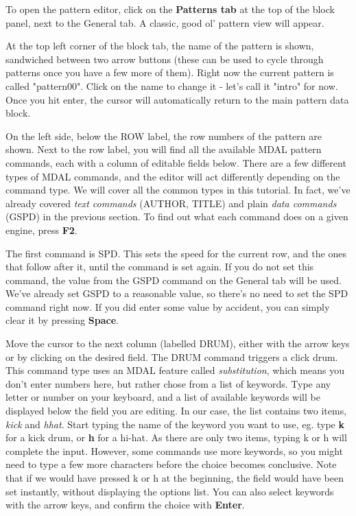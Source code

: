 \documentclass[12pt]{report}	%
\begin{document}
To open the pattern editor, click on the \textbf{Patterns tab} at the top of the block panel, next to the General tab. A classic, good ol' pattern view will appear.

At the top left corner of the block tab, the name of the pattern is shown, sandwiched between two arrow buttons (these can be used to cycle through patterns once you have a few more of them). Right now the current pattern is called "pattern00". Click on the name to change it - let's call it "intro" for now. Once you hit enter, the cursor will automatically return to the main pattern data block.

On the left side, below the ROW label, the row numbers of the pattern are shown. Next to the row label, you will find all the available MDAL pattern commands, each with a column of editable fields below. There are a few different types of MDAL commands, and the editor will act differently depending on the command type. We will cover all the common types in this tutorial. In fact, we've already covered \textit{text commands} (AUTHOR, TITLE) and plain \textit{data commands} (GSPD) in the previous section. To find out what each command does on a given engine, press \textbf{F2}.

The first command is SPD. This sets the speed for the current row, and the ones that follow after it, until the command is set again. If you do not set this command, the value from the GSPD command on the General tab will be used. We've already set GSPD to a reasonable value, so there's no need to set the SPD command right now. If you did enter some value by accident, you can simply clear it by pressing \textbf{Space}.

Move the cursor to the next column (labelled DRUM), either with the arrow keys or by clicking on the desired field. The DRUM command triggers a click drum. This command type uses an MDAL feature called \textit{substitution}, which means you don't enter numbers here, but rather chose from a list of keywords. Type any letter or number on your keyboard, and a list of available keywords will be displayed below the field you are editing. In our case, the list contains two items, \textit{kick} and \textit{hhat}. Start typing the name of the keyword you want to use, eg. type \textbf{k} for a kick drum, or \textbf{h} for a hi-hat. As there are only two items, typing k or h will complete the input. However, some commands use more keywords, so you might need to type a few more characters before the choice becomes conclusive. Note that if we would have pressed k or h at the beginning, the field would have been set instantly, without displaying the options list. You can also select keywords with the arrow keys, and confirm the choice with \textbf{Enter}.
\end{document}
